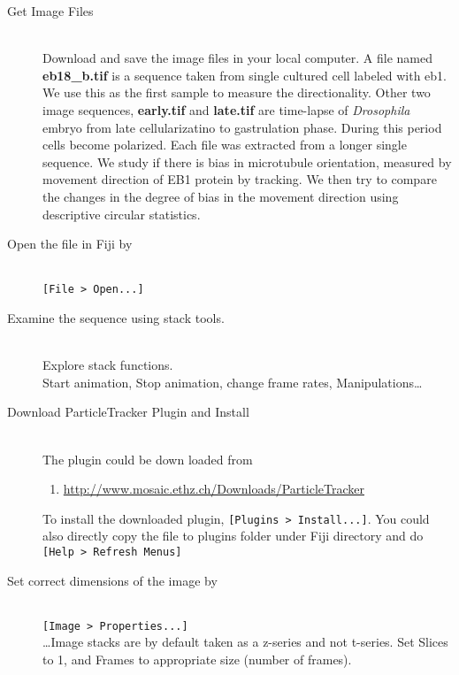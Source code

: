 \documentclass[11pnt]{article}
\begin{document}
\begin{description}
\item[Get Image Files]\hfill\\

Download and save the image files in your local computer. A file named \textbf{eb18\_b.tif} is a sequence taken from single cultured cell labeled with eb1. We use this as the first sample to measure the directionality. Other two image sequences, \textbf{early.tif} and \textbf{late.tif} are time-lapse of \textit{Drosophila} embryo from late cellularizatino to gastrulation phase. During this period cells become polarized. Each file was extracted from a longer single sequence.  We study if there is bias in microtubule orientation, measured by movement direction of EB1 protein by tracking. We then try to compare the changes in the degree of bias in the movement direction using descriptive circular statistics. 

\item[Open the file in Fiji by]\hfill\\

\verb"[File > Open...]"\\

\item[Examine the sequence using stack tools.]\hfill\\

Explore stack functions. \\
Start animation, Stop animation, change frame rates, Manipulations\dots

\item[Download ParticleTracker Plugin and Install]\hfill\\

The plugin could be down loaded from
\begin{enumerate}
\item \url{http://www.mosaic.ethz.ch/Downloads/ParticleTracker}
\end{enumerate}
To install the downloaded plugin, \verb"[Plugins > Install...]". You could also directly copy the file to plugins folder under Fiji directory and do \verb"[Help > Refresh Menus]" 
\item[Set correct dimensions of the image by]\hfill\\
\verb"[Image > Properties...]"\\

\dots Image stacks are by default taken as a z-series and not t-series. Set Slices to 1, and Frames to appropriate size (number of frames).


\end{description}
\end{document}
